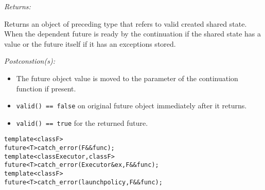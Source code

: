\documentclass[a4paper,10pt]{article}
\newcommand{\cpp}[1]{\lstinline{#1}}
\newcommand{\wordingItem}[1]{\noindent\textit{#1:}}
\newenvironment{wordingPara}{\begin{adjustwidth}{12pt}{}}{\end{adjustwidth}}
\newenvironment{Returns}{\wordingItem{Returns}\vspace{7pt}\noindent\begin{adjustwidth}{12pt}{}}{\vspace{7pt}\end{adjustwidth}}
\newenvironment{Postconditions}{\wordingItem{Postconstion(s)}\vspace{7pt}\noindent\begin{adjustwidth}{12pt}{}}{\vspace{7pt}\end{adjustwidth}}
\newcommand{\update}[1]{\colorbox{update_color}{#1}}
\begin{document}
\begin{wordingPara}
\begin{Returns}
Returns an object of preceding type that refers to valid created shared state. When the dependent future is ready by 
the continuation if the shared state has a value or the future itself if it has an exceptions stored. 
\end{Returns}

\begin{Postconditions}
\begin{itemize}
\item The future object value is moved to the parameter of the continuation function if present.
\item \cpp{valid() == false} on original future object immediately after it returns.
\item \cpp{valid() == true} for the returned future.
\end{itemize}
\end{Postconditions}

\end{wordingPara}
\begin{alltt}
\update{template<class F> }
\update{future<T> catch_error(F&& func); }
\update{template<class Executor, class F> }
\update{future<T> catch_error(Executor &ex, F&& func); }
\update{template<class F> }
\update{future<T> catch_error(launch policy, F&& func);}
\end{alltt}
\end{document}
